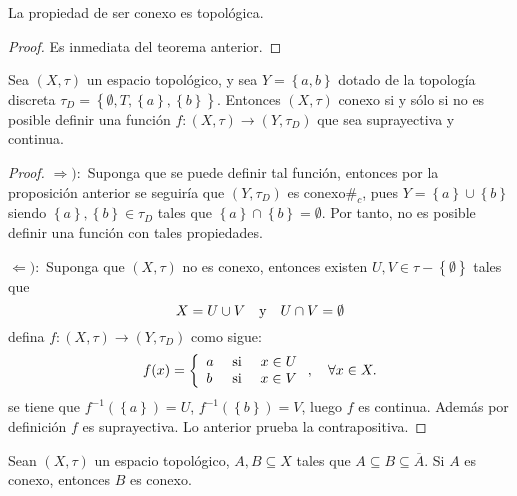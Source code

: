 \documentclass[12pt]{report}
\theoremstyle{largebreak}
\newcommand\cf[3]{\ensuremath{#1:#2\rightarrow#3}}
\newcommand\contradiction{\ensuremath{\#_c}}
\newcommand{\Cls}[1]{\ensuremath{\overline{#1}}}
\begin{document}
    \begin{cor}
        La propiedad de ser conexo es topológica.
    \end{cor}

    \begin{proof}
        Es inmediata del teorema anterior.
    \end{proof}

    \begin{propo}
        Sea $(X,\tau)$ un espacio topológico, y sea $Y=\left\{a,b\right\}$ dotado de la topología discreta $\tau_D=\left\{\emptyset,T,\left\{a\right\},\left\{b\right\} \right\}$. Entonces $(X,\tau)$ conexo si y sólo si no es posible definir una función $\cf{f}{(X,\tau)}{(Y,\tau_D)}$ que sea suprayectiva y continua.
    \end{propo}

    \begin{proof}
        $\Rightarrow):$ Suponga que se puede definir tal función, entonces por la proposición anterior se seguiría que $(Y,\tau_D)$ es conexo\contradiction, pues $Y=\left\{a\right\}\cup\left\{b\right\}$ siendo $\left\{a\right\},\left\{b\right\}\in\tau_D$ tales que $\left\{a\right\}\cap\left\{b\right\}=\emptyset$. Por tanto, no es posible definir una función con tales propiedades.

        $\Leftarrow):$ Suponga que $(X,\tau)$ no es conexo, entonces existen $U,V\in\tau-\left\{\emptyset\right\}$ tales que
        \begin{equation*}
            X=U\cup V\quad\textup{y}\quad U\cap V=\emptyset
        \end{equation*}
        defina $\cf{f}{(X,\tau)}{(Y,\tau_D)}$ como sigue:
        \begin{equation*}
            f(x)=\left\{
                \begin{array}{lcr}
                    a & \textup{ si } & x\in U\\
                    b & \textup{ si } & x\in V\\
                \end{array}
            \right.,\quad\forall x\in X.
        \end{equation*}
        se tiene que $f^{-1}(\left\{a\right\})=U$, $f^{-1}(\left\{b\right\})=V$, luego $f$ es continua. Además por definición $f$ es suprayectiva. Lo anterior prueba la contrapositiva.
    \end{proof}

    \begin{propo}
        Sean $(X,\tau)$ un espacio topológico, $A,B\subseteq X$ tales que $A\subseteq B\subseteq \Cls{A}$. Si $A$ es conexo, entonces $B$ es conexo.
    \end{propo}
\end{document}

